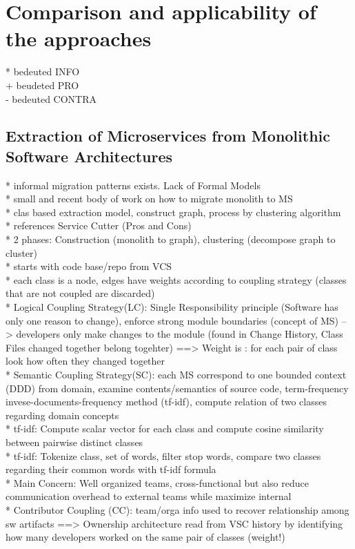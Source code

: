 \pagebreak



\section{Comparison and applicability of the approaches}
\label{sec:StateOfTheArt:ComparisonAndApplicability}
* bedeuted INFO \\
+ beudeted PRO \\
- bedeuted CONTRA \\

\subsection{Extraction of Microservices from Monolithic Software Architectures}
* informal migration patterns exists. Lack of Formal Models \\
* small and recent body of work on how to migrate monolith to MS\\
* clas based extraction model, construct graph, process by clustering algorithm\\
* references Service Cutter (Pros and Cons)\\
* 2 phases: Construction (monolith to graph), clustering (decompose graph to cluster)\\
* starts with code base/repo from VCS\\
* each class is a node, edges have weights according to coupling strategy (classes that are not coupled are discarded)\\
* Logical Coupling Strategy(LC): Single Responsibility principle (Software has only one reason to change), enforce strong module boundaries (concept of MS) --> developers only make changes to the module (found in Change History, Class Files changed together belong togehter) ==> Weight is : for each pair of class look how often they changed together\\
* Semantic Coupling Strategy(SC): each MS correspond to one bounded context (DDD) from domain, examine contents/semantics of source code, term-frequency invese-documents-frequency method (tf-idf), compute relation of two classes regarding domain concepts\\
* tf-idf: Compute scalar vector for each class and compute cosine similarity between pairwise distinct classes\\
* tf-idf: Tokenize class, set of words, filter stop words, compare two classes regarding their common words with tf-idf formula\\
* Main Concern: Well organized teams, cross-functional but also reduce communication overhead to external teams while maximize internal\\
* Contributor Coupling (CC): team/orga info used to recover relationship among sw artifacts ==> Ownership architecture read from VSC history by identifying how many developers worked on the same pair of classes (weight!)\\


